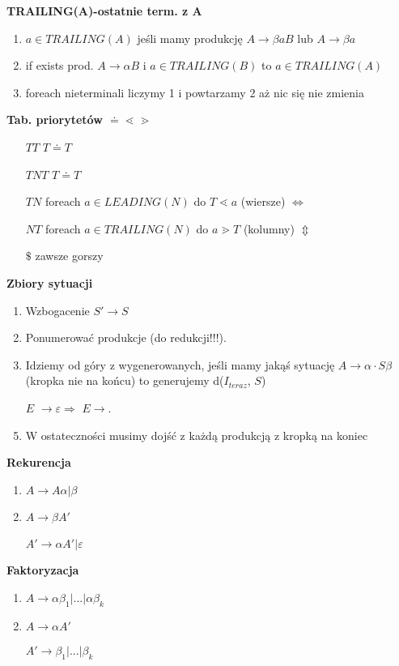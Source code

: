 \begin{multicols}{3}
    \textbf{TRAILING(A)-ostatnie term. z A}
    \begin{enumerate}
      \item	$a \in TRAILING(A)$ jeśli mamy produkcję $A\rightarrow \beta aB$ lub $A \rightarrow \beta a$ 
      \item if exists prod. $A\rightarrow \alpha B$ i $a \in TRAILING(B)$ to $a \in TRAILING(A)$
      \item foreach nieterminali liczymy 1 i powtarzamy 2 aż nic się nie zmienia
    \end{enumerate}
    \textbf{Tab. priorytetów $\doteq \lessdot \gtrdot $}
    \begin{enumerate}
      \item [$TT$] $T \doteq T$
      \item [$TNT$] $T \doteq T$
      \item [$TN$] foreach $a \in LEADING(N)$ do $T \lessdot a$ (wiersze) $ \Leftrightarrow $
      \item [$NT$] foreach $a \in TRAILING(N)$ do $a \gtrdot T$ (kolumny) $ \Updownarrow $
      \item [$\$$] zawsze gorszy
    \end{enumerate}
    \textbf{Zbiory sytuacji}
    \begin{enumerate}
      \item Wzbogacenie $ S' \rightarrow S$ 
      \item Ponumerować produkcje (do redukcji!!!).
      \item Idziemy od góry z wygenerowanych, jeśli mamy jakąś sytuację $ A \rightarrow \alpha \cdot S \beta $ (kropka nie na końcu) to generujemy d($I_{teraz}$, $S$)
      \item [$ E $]$\rightarrow \varepsilon \Rightarrow$ $E \rightarrow . $
      \item W ostateczności musimy dojść z każdą produkcją z kropką na koniec
    \end{enumerate}
    \textbf{Rekurencja}
    \begin{enumerate}
      \item $A \rightarrow A \alpha | \beta$
      \item $A \rightarrow \beta A'$ \\ \\ $A' \rightarrow \alpha A' | \varepsilon $
    \end{enumerate}
    \textbf{Faktoryzacja}
    \begin{enumerate}
      \item $A \rightarrow \alpha \beta _{1}|...|\alpha \beta _{k}$
      \item $A \rightarrow \alpha A'$ \\ \\
      $A' \rightarrow \beta _{1}|...|\beta _{k}$
    \end{enumerate}
\end{multicols}
 